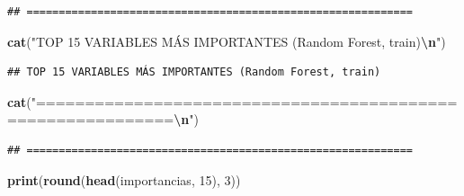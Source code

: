 \documentclass[
]{book}
\newenvironment{Shaded}{\begin{snugshade}}{\end{snugshade}}
\newcommand{\DecValTok}[1]{\textcolor[rgb]{0.00,0.00,0.81}{#1}}
\newcommand{\FunctionTok}[1]{\textcolor[rgb]{0.13,0.29,0.53}{\textbf{#1}}}
\newcommand{\NormalTok}[1]{#1}
\newcommand{\SpecialCharTok}[1]{\textcolor[rgb]{0.81,0.36,0.00}{\textbf{#1}}}
\newcommand{\StringTok}[1]{\textcolor[rgb]{0.31,0.60,0.02}{#1}}
\begin{document}
\begin{verbatim}
## ============================================================
\end{verbatim}

\begin{Shaded}
\begin{Highlighting}[]
\FunctionTok{cat}\NormalTok{(}\StringTok{"TOP 15 VARIABLES MÁS IMPORTANTES (Random Forest, train)}\SpecialCharTok{\textbackslash{}n}\StringTok{"}\NormalTok{)}
\end{Highlighting}
\end{Shaded}

\begin{verbatim}
## TOP 15 VARIABLES MÁS IMPORTANTES (Random Forest, train)
\end{verbatim}

\begin{Shaded}
\begin{Highlighting}[]
\FunctionTok{cat}\NormalTok{(}\StringTok{"============================================================}\SpecialCharTok{\textbackslash{}n}\StringTok{"}\NormalTok{)}
\end{Highlighting}
\end{Shaded}

\begin{verbatim}
## ============================================================
\end{verbatim}

\begin{Shaded}
\begin{Highlighting}[]
\FunctionTok{print}\NormalTok{(}\FunctionTok{round}\NormalTok{(}\FunctionTok{head}\NormalTok{(importancias, }\DecValTok{15}\NormalTok{), }\DecValTok{3}\NormalTok{))}
\end{Highlighting}
\end{Shaded}
\end{document}
